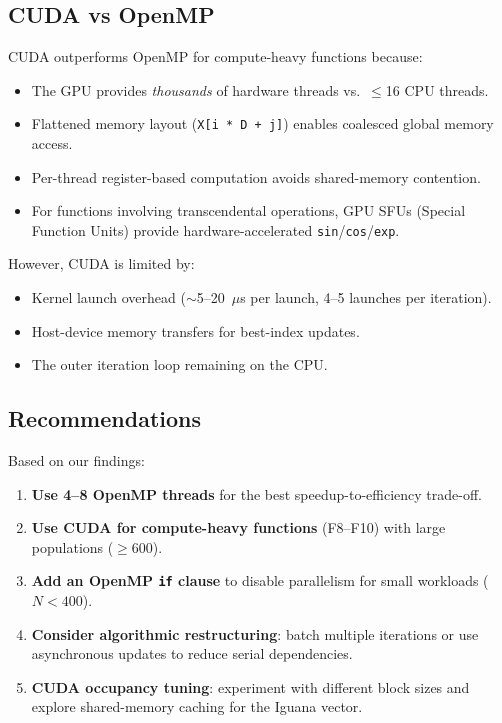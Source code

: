 \documentclass[12pt, a4paper]{article}
\begin{document}
\subsection{CUDA vs OpenMP}

CUDA outperforms OpenMP for compute-heavy functions because:
\begin{itemize}
    \item The GPU provides \textit{thousands} of hardware threads vs.\ $\leq$16 CPU threads.
    \item Flattened memory layout (\texttt{X[i * D + j]}) enables coalesced global memory access.
    \item Per-thread register-based computation avoids shared-memory contention.
    \item For functions involving transcendental operations, GPU SFUs (Special Function Units) provide hardware-accelerated \texttt{sin}/\texttt{cos}/\texttt{exp}.
\end{itemize}

However, CUDA is limited by:
\begin{itemize}
    \item Kernel launch overhead ($\sim$5--20~$\mu$s per launch, 4--5 launches per iteration).
    \item Host-device memory transfers for best-index updates.
    \item The outer iteration loop remaining on the CPU.
\end{itemize}

\subsection{Recommendations}

Based on our findings:

\begin{enumerate}
    \item \textbf{Use 4--8 OpenMP threads} for the best speedup-to-efficiency trade-off.
    \item \textbf{Use CUDA for compute-heavy functions} (F8--F10) with large populations ($\geq$600).
    \item \textbf{Add an OpenMP \texttt{if} clause} to disable parallelism for small workloads ($N < 400$).
    \item \textbf{Consider algorithmic restructuring}: batch multiple iterations or use asynchronous updates to reduce serial dependencies.
    \item \textbf{CUDA occupancy tuning}: experiment with different block sizes and explore shared-memory caching for the Iguana vector.
\end{enumerate}
\end{document}
